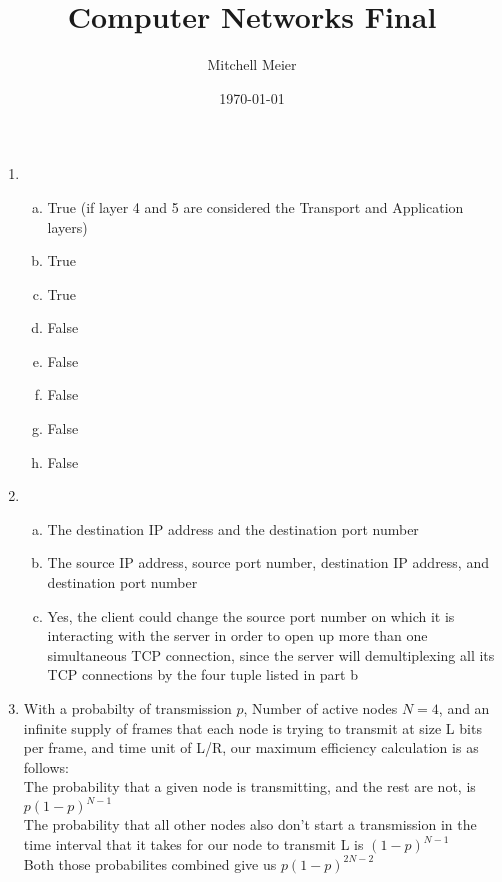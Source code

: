 \documentclass[14pt]{article}
\title{Computer Networks Final}
\author{Mitchell Meier}
\date{\today}
\begin{document}
\maketitle

\begin{enumerate}

\item
\begin{enumerate}[(a)]
\item
True (if layer 4 and 5 are considered the Transport and Application layers)
\item
True
\item
True
\item
False
\item
False
\item
False
\item
False
\item
False
\end{enumerate}

\item
\begin{enumerate}[(a)]
\item
The destination IP address and the destination port number
\item
The source IP address, source port number, destination IP address, and destination port number
\item
Yes, the client could change the source port number on which it is interacting with the server in order to open up more than one simultaneous TCP connection, since the server will demultiplexing all its TCP connections by the four tuple listed in part b
\end{enumerate}

\pagebreak

\item
With a probabilty of transmission $p$, Number of active nodes $N=4$, and an infinite supply of frames that each node is trying to transmit at size L bits per frame, and time unit of L/R, our maximum efficiency calculation is as follows: \\

The probability that a given node is transmitting, and the rest are not, is $p(1-p)^{N-1}$ \\

The probability that all other nodes also don't start a transmission in the time interval that it takes for our node to transmit L is $(1-p)^{N-1}$ \\

Both those probabilites combined give us $p(1-p)^{2N -2}$ \\


\end{enumerate}
\end{document}
